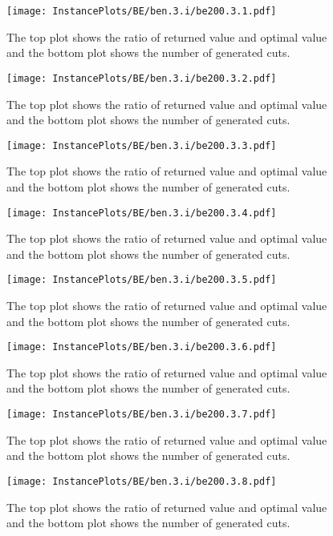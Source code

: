 \documentclass[10pt,a4paper]{article}
\begin{document}
\begin{figure}[H]
\texttt{[image: InstancePlots/BE/ben.3.i/be200.3.1.pdf]}
\caption{The top plot shows the ratio of returned value and optimal value     and the bottom plot shows the number of generated cuts.}
\end{figure}

\begin{figure}[H]
\texttt{[image: InstancePlots/BE/ben.3.i/be200.3.2.pdf]}
\caption{The top plot shows the ratio of returned value and optimal value     and the bottom plot shows the number of generated cuts.}
\end{figure}

\begin{figure}[H]
\texttt{[image: InstancePlots/BE/ben.3.i/be200.3.3.pdf]}
\caption{The top plot shows the ratio of returned value and optimal value     and the bottom plot shows the number of generated cuts.}
\end{figure}

\begin{figure}[H]
\texttt{[image: InstancePlots/BE/ben.3.i/be200.3.4.pdf]}
\caption{The top plot shows the ratio of returned value and optimal value     and the bottom plot shows the number of generated cuts.}
\end{figure}

\begin{figure}[H]
\texttt{[image: InstancePlots/BE/ben.3.i/be200.3.5.pdf]}
\caption{The top plot shows the ratio of returned value and optimal value     and the bottom plot shows the number of generated cuts.}
\end{figure}

\begin{figure}[H]
\texttt{[image: InstancePlots/BE/ben.3.i/be200.3.6.pdf]}
\caption{The top plot shows the ratio of returned value and optimal value     and the bottom plot shows the number of generated cuts.}
\end{figure}

\begin{figure}[H]
\texttt{[image: InstancePlots/BE/ben.3.i/be200.3.7.pdf]}
\caption{The top plot shows the ratio of returned value and optimal value     and the bottom plot shows the number of generated cuts.}
\end{figure}

\begin{figure}[H]
\texttt{[image: InstancePlots/BE/ben.3.i/be200.3.8.pdf]}
\caption{The top plot shows the ratio of returned value and optimal value     and the bottom plot shows the number of generated cuts.}
\end{figure}
\end{document}
